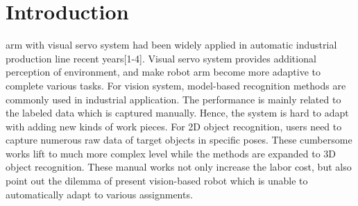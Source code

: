 \documentclass[journal]{IEEEtran}
\begin{document}
%
\IEEEpeerreviewmaketitle



\section{Introduction}


% 
% 
% 
% 
 arm with visual servo system had been widely applied in automatic industrial production line recent years[1-4]. Visual servo system provides additional perception of environment, and make robot arm become more adaptive to complete various tasks. For vision system, model-based recognition methods are commonly used in industrial application. The performance is mainly related to the labeled data which is captured manually. Hence, the system is hard to adapt with adding new kinds of work pieces. For 2D object recognition, users need to capture numerous raw data of target objects in specific poses. These cumbersome works lift to much more complex level while the methods are expanded to 3D object recognition. These manual works not only increase the labor cost, but also point out the dilemma of present vision-based robot which is unable to automatically adapt to various assignments. 
\end{document}
